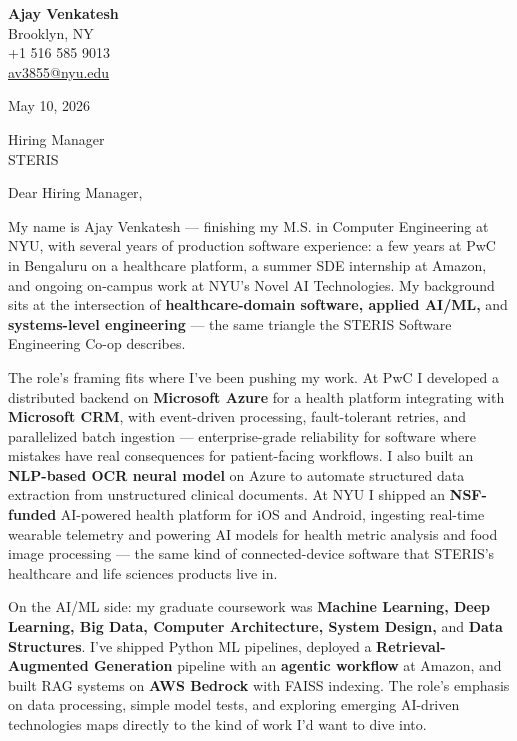 \documentclass[letterpaper,11pt]{article}
\begin{document}
\begin{flushleft}
\textbf{\large Ajay Venkatesh} \\
Brooklyn, NY \\
+1 516 585 9013 \\
\href{mailto:av3855@nyu.edu}{av3855@nyu.edu}
\end{flushleft}

\vspace{10pt}

May 10, 2026

\vspace{6pt}

Hiring Manager \\
STERIS

\vspace{10pt}

Dear Hiring Manager,

My name is Ajay Venkatesh --- finishing my M.S. in Computer Engineering at NYU, with several years of production software experience: a few years at PwC in Bengaluru on a healthcare platform, a summer SDE internship at Amazon, and ongoing on-campus work at NYU's Novel AI Technologies. My background sits at the intersection of \textbf{healthcare-domain software, applied AI/ML,} and \textbf{systems-level engineering} --- the same triangle the STERIS Software Engineering Co-op describes.

The role's framing fits where I've been pushing my work. At PwC I developed a distributed backend on \textbf{Microsoft Azure} for a health platform integrating with \textbf{Microsoft CRM}, with event-driven processing, fault-tolerant retries, and parallelized batch ingestion --- enterprise-grade reliability for software where mistakes have real consequences for patient-facing workflows. I also built an \textbf{NLP-based OCR neural model} on Azure to automate structured data extraction from unstructured clinical documents. At NYU I shipped an \textbf{NSF-funded} AI-powered health platform for iOS and Android, ingesting real-time wearable telemetry and powering AI models for health metric analysis and food image processing --- the same kind of connected-device software that STERIS's healthcare and life sciences products live in.

On the AI/ML side: my graduate coursework was \textbf{Machine Learning, Deep Learning, Big Data, Computer Architecture, System Design,} and \textbf{Data Structures}. I've shipped Python ML pipelines, deployed a \textbf{Retrieval-Augmented Generation} pipeline with an \textbf{agentic workflow} at Amazon, and built RAG systems on \textbf{AWS Bedrock} with FAISS indexing. The role's emphasis on data processing, simple model tests, and exploring emerging AI-driven technologies maps directly to the kind of work I'd want to dive into.
\end{document}
